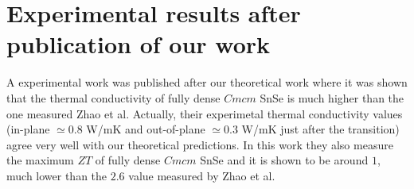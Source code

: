 \section{Experimental results after publication of our work}

A experimental work\cite{wei2019thermoelectric} was published after our theoretical work where it was shown that the thermal conductivity of fully dense $Cmcm$ SnSe is much higher than the one measured Zhao et al. Actually, their experimetal thermal conductivity values (in-plane $\simeq0.8$ W/mK and out-of-plane $\simeq0.3$ W/mK just after the transition) agree very well with our theoretical predictions. In this work they also measure the maximum $ZT$ of fully dense $Cmcm$ SnSe and it is shown to be around $1$, much lower than the $2.6$ value measured by Zhao et al. 
